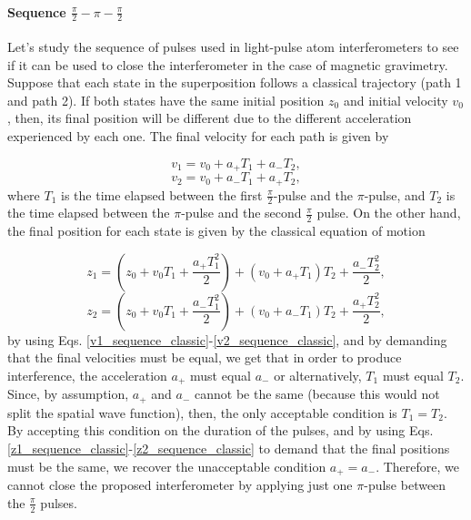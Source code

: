 \documentclass{article}
\begin{document}
\paragraph{Sequence $\frac{\pi}{2} - \pi - \frac{\pi}{2}$}
Let's study the sequence of pulses used in light-pulse atom interferometers to see if it can be used to close the interferometer in the case of magnetic gravimetry. Suppose that each state in the superposition follows a classical trajectory (path 1 and path 2). If both states have the same initial position $z_0$ and initial velocity $v_0$, then, its final position will be different due to the different acceleration experienced by each one. The final velocity for each path is given by

\begin{equation}\label{v1_sequence_classic}
v_{1} = v_{0} + a_{+} T_{1} + a_{-} T_{2},
\end{equation}
\begin{equation}\label{v2_sequence_classic}
v_{2} = v_{0} + a_{-} T_{1} + a_{+} T_{2},
\end{equation}
%
where $T_{1}$ is the time elapsed between the first $\frac{\pi}{2}$-pulse and the $\pi$-pulse, and $T_{2}$ is the time elapsed between the $\pi$-pulse and the second $\frac{\pi}{2}$ pulse. On the other hand, the final position for each state is given by the classical equation of motion

\begin{equation}\label{z1_sequence_classic}
z_{1} = (z_{0} + v_{0} T_{1} + \frac{a_{+} T^{2}_{1}}{2}) + (v_{0}+a_{+}T_{1})T_{2} + \frac{a_{-} T^{2}_{2}}{2},
\end{equation}
\begin{equation}\label{z2_sequence_classic}
z_{2} = (z_{0} + v_{0} T_{1} + \frac{a_{-} T^{2}_{1}}{2}) + (v_{0}+a_{-}T_{1})T_{2} + \frac{a_{+} T^{2}_{2}}{2},
\end{equation}
%
by using Eqs. \ref{v1_sequence_classic}-\ref{v2_sequence_classic}, and by demanding that the final velocities must be equal, we get that in order to produce interference, the acceleration $a_{+}$ must equal $a_{-}$ or alternatively, $T_{1}$ must equal $T_{2}$. Since, by assumption, $a_{+}$ and $a_{-}$ cannot be the same (because this would not split the spatial wave function), then, the only acceptable condition is $T_{1}=T_{2}$. By accepting this condition on the duration of the pulses, and by using Eqs. \ref{z1_sequence_classic}-\ref{z2_sequence_classic} to demand that the final positions must be the same, we recover the unacceptable condition $a_{+}=a_{-}$. Therefore, we cannot close the proposed interferometer by applying just one $\pi$-pulse between the $\frac{\pi}{2}$ pulses.
\end{document}
